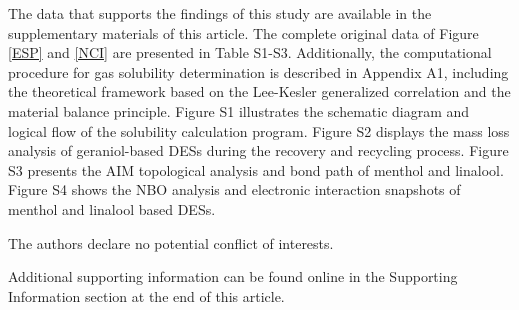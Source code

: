 \documentclass[AMA,LATO2COL]{WileyNJDv5} %
\begin{document}

The data that supports the findings of this study are available in the supplementary materials of this article. The complete original data of Figure \ref{ESP} and \ref{NCI} are presented in Table S1-S3. Additionally, the computational procedure for gas solubility determination is described in Appendix A1, including the theoretical framework based on the Lee-Kesler generalized correlation and the material balance principle. Figure S1 illustrates the schematic diagram and logical flow of the solubility calculation program. Figure S2 displays the mass loss analysis of geraniol-based DESs during the recovery and recycling process. Figure S3 presents the AIM topological analysis and bond path of menthol and linalool. Figure S4 shows the NBO analysis and electronic interaction snapshots of menthol and linalool based DESs.


The authors declare no potential conflict of interests.





Additional supporting information can be found online in the Supporting Information section at the end of this article.
\end{document}
